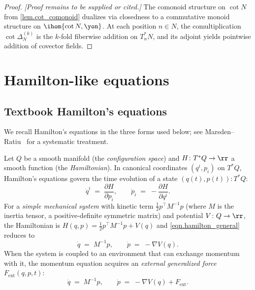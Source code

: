 \begin{proof}
\emph{[Proof remains to be supplied or cited.]} The comonoid structure on $\cot{N}$ from \cref{lem.cot_comonoid} dualizes via closedness to a commutative monoid structure on $\ihom{\cot{N},\yon}$. At each position $n\in N$, the comultiplication $\cot{\Delta_N^{(k)}}$ is the $k$-fold fiberwise addition on $T^*_n N$, and its adjoint yields pointwise addition of covector fields.
\end{proof}

\section{Hamilton-like equations}\label{sec.hamilton}

\subsection{Textbook Hamilton's equations}\label{sec.textbook_hamilton}

We recall Hamilton's equations in the three forms used below; see Marsden--Ratiu~\cite[\S2.4 (canonical form, Prop.~2.4.4), \S7.7 eq.~(7.7.7) (simple mechanical), \S7.8 eq.~(7.8.14) and Thm.~7.8.6 (Lagrange--d'Alembert with external forces)]{marsden1999introduction} for a systematic treatment.

Let $Q$ be a smooth manifold (the \emph{configuration space}) and $H\colon T^*Q\to\rr$ a smooth function (the \emph{Hamiltonian}). In canonical coordinates $(q^i, p_i)$ on $T^*Q$, Hamilton's equations govern the time evolution of a state $(q(t), p(t)): T^*Q$:
\begin{equation}\label{eqn.hamilton_general}
\dot q^i \;=\; \frac{\partial H}{\partial p_i},
\qquad
\dot p_i \;=\; -\frac{\partial H}{\partial q^i}.
\end{equation}
For a \emph{simple mechanical system} with kinetic term $\tfrac{1}{2}p^\top M^{-1}p$ (where $M$ is the inertia tensor, a positive-definite symmetric matrix) and potential $V\colon Q\to\rr$, the Hamiltonian is $H(q,p)=\tfrac{1}{2}p^\top M^{-1}p+V(q)$ and \eqref{eqn.hamilton_general} reduces to
\begin{equation}\label{eqn.hamilton_mechanical}
\dot q \;=\; M^{-1}p,
\qquad
\dot p \;=\; -\nabla V(q).
\end{equation}
When the system is coupled to an environment that can exchange momentum with it, the momentum equation acquires an \emph{external generalized force} $F_\mathrm{ext}(q,p,t)$:
\begin{equation}\label{eqn.hamilton_forced}
\dot q \;=\; M^{-1}p,
\qquad
\dot p \;=\; -\nabla V(q) + F_\mathrm{ext}.
\end{equation}

